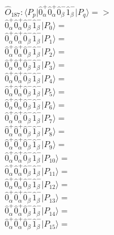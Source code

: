 \documentclass[14pt]{article}
\begin{document}
    $\hat{O}_{187}:  \langle{P_p}\vert \hat{0}_{\alpha}^{+}\hat{0}_{\alpha}^{+}\hat{0}_{\beta}^{-}\hat{1}_{\beta}^{-} \vert{P_q}\rangle => $ \\ 
    $ \hat{0}_{\alpha}^{+}\hat{0}_{\alpha}^{+}\hat{0}_{\beta}^{-}\hat{1}_{\beta}^{-} \vert{P_{0}}\rangle =  $ \\ 
    $ \hat{0}_{\alpha}^{+}\hat{0}_{\alpha}^{+}\hat{0}_{\beta}^{-}\hat{1}_{\beta}^{-} \vert{P_{1}}\rangle =  $ \\ 
    $ \hat{0}_{\alpha}^{+}\hat{0}_{\alpha}^{+}\hat{0}_{\beta}^{-}\hat{1}_{\beta}^{-} \vert{P_{2}}\rangle =  $ \\ 
    $ \hat{0}_{\alpha}^{+}\hat{0}_{\alpha}^{+}\hat{0}_{\beta}^{-}\hat{1}_{\beta}^{-} \vert{P_{3}}\rangle =  $ \\ 
    $ \hat{0}_{\alpha}^{+}\hat{0}_{\alpha}^{+}\hat{0}_{\beta}^{-}\hat{1}_{\beta}^{-} \vert{P_{4}}\rangle =  $ \\ 
    $ \hat{0}_{\alpha}^{+}\hat{0}_{\alpha}^{+}\hat{0}_{\beta}^{-}\hat{1}_{\beta}^{-} \vert{P_{5}}\rangle =  $ \\ 
    $ \hat{0}_{\alpha}^{+}\hat{0}_{\alpha}^{+}\hat{0}_{\beta}^{-}\hat{1}_{\beta}^{-} \vert{P_{6}}\rangle =  $ \\ 
    $ \hat{0}_{\alpha}^{+}\hat{0}_{\alpha}^{+}\hat{0}_{\beta}^{-}\hat{1}_{\beta}^{-} \vert{P_{7}}\rangle =  $ \\ 
    $ \hat{0}_{\alpha}^{+}\hat{0}_{\alpha}^{+}\hat{0}_{\beta}^{-}\hat{1}_{\beta}^{-} \vert{P_{8}}\rangle =  $ \\ 
    $ \hat{0}_{\alpha}^{+}\hat{0}_{\alpha}^{+}\hat{0}_{\beta}^{-}\hat{1}_{\beta}^{-} \vert{P_{9}}\rangle =  $ \\ 
    $ \hat{0}_{\alpha}^{+}\hat{0}_{\alpha}^{+}\hat{0}_{\beta}^{-}\hat{1}_{\beta}^{-} \vert{P_{10}}\rangle =  $ \\ 
    $ \hat{0}_{\alpha}^{+}\hat{0}_{\alpha}^{+}\hat{0}_{\beta}^{-}\hat{1}_{\beta}^{-} \vert{P_{11}}\rangle =  $ \\ 
    $ \hat{0}_{\alpha}^{+}\hat{0}_{\alpha}^{+}\hat{0}_{\beta}^{-}\hat{1}_{\beta}^{-} \vert{P_{12}}\rangle =  $ \\ 
    $ \hat{0}_{\alpha}^{+}\hat{0}_{\alpha}^{+}\hat{0}_{\beta}^{-}\hat{1}_{\beta}^{-} \vert{P_{13}}\rangle =  $ \\ 
    $ \hat{0}_{\alpha}^{+}\hat{0}_{\alpha}^{+}\hat{0}_{\beta}^{-}\hat{1}_{\beta}^{-} \vert{P_{14}}\rangle =  $ \\ 
    $ \hat{0}_{\alpha}^{+}\hat{0}_{\alpha}^{+}\hat{0}_{\beta}^{-}\hat{1}_{\beta}^{-} \vert{P_{15}}\rangle =  $ \\ 
    
\end{document}
